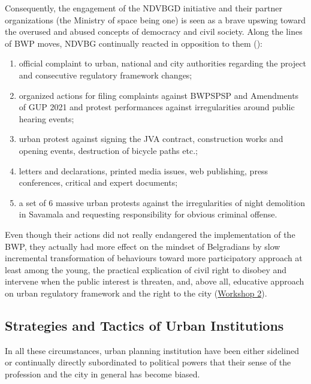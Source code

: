 \documentclass[11pt]{report}
\begin{document}
{Consequently, the engagement of the NDVBGD initiative and their partner organizations (the Ministry of space being one) is seen as a brave upswing toward the overused and abused concepts of democracy and civil society.
Along the lines of BWP moves, NDVBG continually reacted in opposition to them (\href{NDVBGD}{\cite{NDVBGD2016}}):

\begin{enumerate}

\item official complaint to urban, national and city authorities regarding the project and consecutive regulatory framework changes;
\item organized actions for filing complaints against BWPSPSP and Amendments of GUP 2021 and protest performances against irregularities around public hearing events;
\item urban protest against signing the JVA contract, construction works and opening events, destruction of bicycle paths etc.;
\item letters and declarations, printed media issues, web publishing, press conferences, critical and expert documents;
\item a set of 6 massive urban protests against the irregularities of night demolition in Savamala and requesting responsibility for obvious criminal offense. 

\end{enumerate}

Even though their actions did not really endangered the implementation of the BWP, they actually had more effect on the mindset of Belgradians by slow incremental transformation of behaviours toward more participatory approach at least among the young, the practical explication of civil right to disobey and intervene when the public interest is threaten, and, above all, educative approach on urban regulatory framework and the right to the city
(\href{PHD Workshop}{Workshop 2}).

\subsection{Strategies and Tactics of Urban Institutions}

In all these circumstances, urban planning institution have been either sidelined or continually directly subordinated to political powers that their sense of the profession and the city in general has become biased.
\\

}
\end{document}
